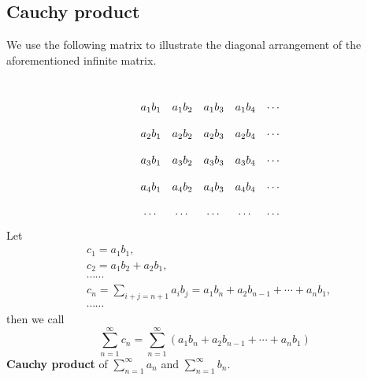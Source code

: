 \documentclass{article}
\theoremstyle{remark}
\newcommand\tikznode[2]{\tikz[remember picture,baseline=(#1.base)]{\node(#1)[inner sep=0pt]{#2};}}
\begin{document}
\subsection{Cauchy product}
We use the following matrix to illustrate the diagonal arrangement of the aforementioned infinite matrix.
\[
\begin{matrix}
 &  & \tikznode{r1c3}{} &\tikznode{r1c4}{}  &\tikznode{r1c5}{}  &\tikznode{r1c6}{} \\
 &  &  &  &  & \\
&\tikznode{r2c2}{$a_1b_1$}  & \tikznode{r2c3}{$a_1b_2$} & \tikznode{r2c4}{$a_1b_3$} & \tikznode{r2c5}{$a_1b_4$} & \cdots\\
 & &  & &  & \\
& \tikznode{r4c2}{$a_2b_1$} & \tikznode{r4c3}{$a_2b_2$} & \tikznode{r4c4}{$a_2b_3$} & a_2b_4 & \cdots\\
 & &  &  &  & \\
& \tikznode{r6c2}{$a_3b_1$} & \tikznode{r6c3}{$a_3b_2$} & \tikznode{r6c4}{$a_3b_3$} & a_3b_4 & \cdots\\
 & &  &  &  & \\
&\tikznode{r8c2}{$a_4b_1$}&\tikznode{r8c3}{$a_4b_2$}&\tikznode{r8c4}{$a_4b_3$}&\tikznode{r8c5}{$a_4b_4$}& \cdots\\
 &  &  &  &  & \\
 & \cdots & \cdots & \cdots & \cdots & \cdots
\end{matrix}
\]
Let
\begin{align*}
 &c_1=a_1b_1, \\
 &c_2=a_1b_2+a_2b_1,\\
 &\cdots\cdots\\
 &c_n=\sum_{i+j=n+1}a_ib_j=a_1b_n+a_2b_{n-1}+\cdots+a_nb_1,\\
 &\cdots\cdots
\end{align*}
then we call 
\[
\sum_{n=1}^{\infty}c_n=\sum_{n=1}^{\infty}(a_1b_n+a_2b_{n-1}+\cdots+a_nb_1)
\]
\textbf{Cauchy product} of $\sum_{n=1}^{\infty}a_n$ and $\sum_{n=1}^{\infty}b_n$.
\end{document}
